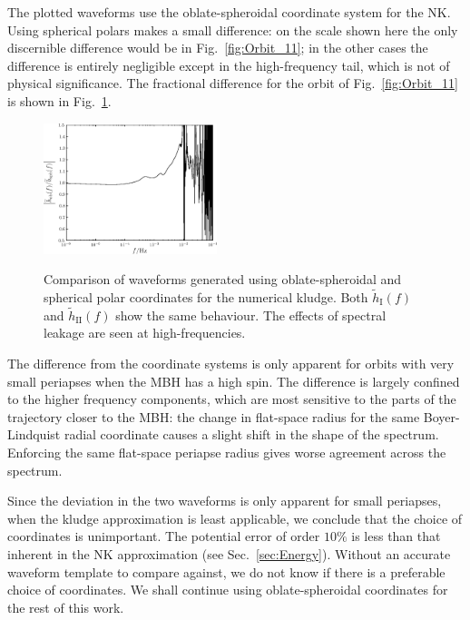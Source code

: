 \documentclass[useAMS,usedcolumn,usegraphicx,usenatbib]{mn2e}
\newcommand{\figref}[1]{Fig.~\ref{fig:#1}}
\newcommand{\secref}[1]{Sec.~\ref{sec:#1}}
\newcommand{\sub}[1]{\ensuremath{_\mathrm{#1}}}
\begin{document}

The plotted waveforms use the oblate-spheroidal coordinate system for the NK. Using spherical polars makes a small difference: on the scale shown here the only discernible difference would be in \figref{Orbit_11}; in the other cases the difference is entirely negligible except in the high-frequency tail, which is not of physical significance. The fractional difference for the orbit of \figref{Orbit_11} is shown in \figref{Oblate_sphere}.
\begin{figure}
\begin{center}
 \includegraphics[width=0.45\textwidth]{Fig_ob_sph_11}
 \label{fig:Oblate_sphere}
 \caption{Comparison of waveforms generated using oblate-spheroidal and spherical polar coordinates for the numerical kludge. Both $\widetilde{h}\sub{I}(f)$ and $\widetilde{h}\sub{II}(f)$ show the same behaviour. The effects of spectral leakage are seen at high-frequencies.} 
  \end{center}
\end{figure}
The difference from the coordinate systems is only apparent for orbits with very small periapses when the MBH has a high spin. The difference is largely confined to the higher frequency components, which are most sensitive to the parts of the trajectory closer to the MBH: the change in flat-space radius for the same Boyer-Lindquist radial coordinate causes a slight shift in the shape of the spectrum. Enforcing the same flat-space periapse radius gives worse agreement across the spectrum.

Since the deviation in the two waveforms is only apparent for small periapses, when the kludge approximation is least applicable, we conclude that the choice of coordinates is unimportant. The potential error of order $10\%$ is less than that inherent in the NK approximation (see \secref{Energy}). Without an accurate waveform template to compare against, we do not know if there is a preferable choice of coordinates. We shall continue using oblate-spheroidal coordinates for the rest of this work.
\end{document}
